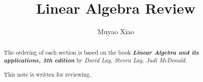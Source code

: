 \documentclass[a4paper]{report}
\title{Linear Algebra Review}
\author{Muyao Xiao}
\begin{document}
\maketitle

\begin{abstract}
    The ordering of each section is based on the book \textbf{\textit{Linear Algebra and its applications, 5th edition}} by  \textit{David Lay, Steven Lay, Judi McDonald}.
    \par 
    This note is written for reviewing.
\end{abstract}

\tableofcontents







\pagestyle{plain}
\printbibliography{}
\end{document}
